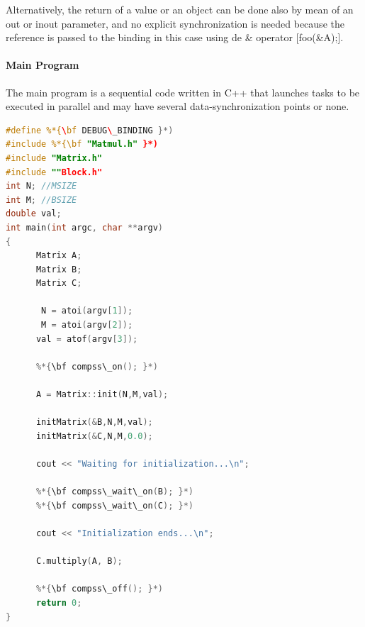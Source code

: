 Alternatively, the return of a value or an object can be done also by mean of an out or inout parameter, 
and no explicit synchronization is needed because the reference is passed to the binding in this case 
using de \& operator [foo(\&A);].

\paragraph{Main Program}
The main program is a sequential code written in C++ that launches tasks to be executed in parallel 
and may have several data-synchronization points or none.

\begin{lstlisting}[language=C++]
#define %*{\bf DEBUG\_BINDING }*)
#include %*{\bf "Matmul.h" }*)
#include "Matrix.h"
#include ""Block.h"
int N; //MSIZE
int M; //BSIZE
double val;
int main(int argc, char **argv)
{
      Matrix A;
      Matrix B;
      Matrix C;

       N = atoi(argv[1]);
       M = atoi(argv[2]);
      val = atof(argv[3]);

      %*{\bf compss\_on(); }*)

      A = Matrix::init(N,M,val);

      initMatrix(&B,N,M,val);
      initMatrix(&C,N,M,0.0);

      cout << "Waiting for initialization...\n";

      %*{\bf compss\_wait\_on(B); }*)
      %*{\bf compss\_wait\_on(C); }*)

      cout << "Initialization ends...\n";
 
      C.multiply(A, B);

      %*{\bf compss\_off(); }*)
      return 0;
}
\end{lstlisting}

